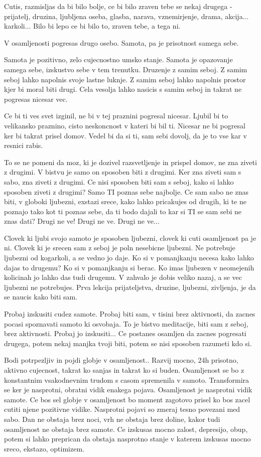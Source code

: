 Cutis, razmisljas da bi bilo bolje, ce bi bilo zraven tebe se nekaj drugega - prijatelj, druzina, ljubljena oseba, glasba, narava, vznemirjenje, drama, akcija... karkoli... Bilo bi lepo ce bi bilo to, zraven tebe, a tega ni. 

V osamljenosti pogresas drugo osebo. Samota, pa je prisotnost samega sebe. 

Samota je pozitivno, zelo cujecnostno umsko stanje. Samota je opazovanje samega sebe, izskustvo sebe v tem trenutku. Druzenje z samim seboj.  Z samim seboj lahko napolnis svoje lastne luknje. Z samim seboj lahko napolnis prostor kjer bi moral biti drugi. Cela vesolja lahko nasicis s samim seboj in takrat ne pogresas nicesar vec. 

Ce bi ti ves svet izginil, ne bi v tej praznini pogresal nicesar.  Ljubil bi to velikansko praznino, cisto neskoncnost v kateri bi bil ti. Nicesar ne bi pogresal ker bi takrat prisel domov. Vedel bi da si ti, sam sebi dovolj, da je to vse kar v resnici rabis. 

To se ne pomeni da moz, ki je dozivel razsvetljenje in prispel domov, ne zna ziveti z drugimi. V bistvu je samo on sposoben biti z drugimi. Ker zna ziveti sam s sabo, zna ziveti z drugimi. Ce nisi sposoben biti sam s seboj, kako si lahko sposoben ziveti z drugimi? Samo TI poznas sebe najbolje. Ce sam sabo ne znas biti, v globoki ljubezni, exstazi srece, kako lahko pricakujes od drugih, ki te ne poznajo tako kot ti poznas sebe, da ti bodo dajali to kar si TI se sam sebi ne znas dati? Drugi ne ve! Drugi ne ve. Drugi ne ve... 

Clovek ki ljubi svojo samoto je sposoben ljubezni, clovek ki cuti osamljenost pa je ni. Clovek ki je srecen sam z seboj je poln nesebicne ljubezni. Ne potrebuje ljubezni od kogarkoli, a se vedno jo daje. Ko si v pomanjkanju necesa kako lahko dajas to drugemu? Ko si v pomanjkanju si berac. Ko imas ljubezen v neomejenih kolicinah jo lahko das tudi drugemu. V zahvalo je dobis veliko nazaj, a se vec ljubezni ne potrebujes.  Prva lekcija prijateljstva, druzine, ljubezni, zivljenja, je da se naucis kako biti sam. 

Probaj izskusiti cudez samote. Probaj biti sam, v tisini brez aktivnosti, da zacnes pocasi spoznavati samoto ki osvobaja. To je bistvo meditacije, biti sam z seboj, brez aktivnosti. Probaj jo izskusiti... Ce postanes osamljen da zacnes pogresati drugega, potem nekaj manjka tvoji biti, potem se nisi sposoben razumeti kdo si. 

Bodi potrpezljiv in pojdi globje v osamljenost.. Razvij mocno, 24h prisotno, aktivno cujecnost, takrat ko sanjas in takrat ko si buden. Osamljenost se bo z konstantnim vsakodnevnim trudom s casom spremenila v samoto. Transformira se ker je nasprotni, obratni vidik enakega pojava. Osamljenost je nasprotni vidik samote. Ce bos sel globje v osamljenost bo moment zagotovo prisel ko bos zacel cutiti njene pozitivne vidike. Nasprotni pojavi so zmeraj tesno povezani med sabo. Dan ne obstaja brez noci, vrh ne obstaja brez doline, kakor tudi osamljenost ne obstaja brez samote. Ce izskusas mocno zalost, depresijo, obup, potem si lahko preprican da obstaja nasprotno stanje v katerem izskusas mocno sreco, ekstazo, optimizem. 

